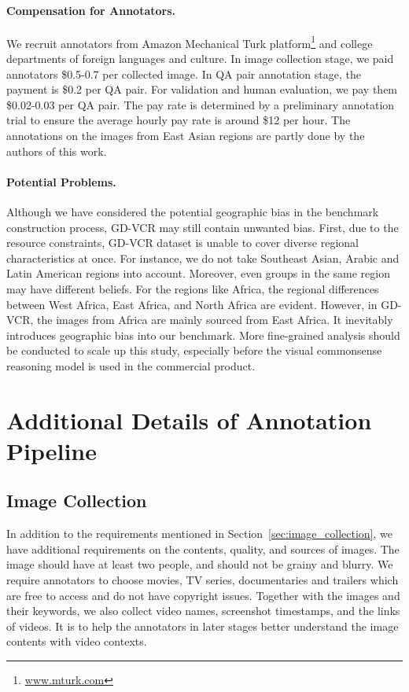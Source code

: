 \documentclass[11pt]{article}
\begin{document}
\paragraph{Compensation for Annotators.}
We recruit annotators from Amazon Mechanical Turk platform\footnote{\url{www.mturk.com}} and college departments of foreign languages and culture. In image collection stage, we paid annotators \$0.5-0.7 per collected image. In QA pair annotation stage, the payment is \$0.2 per QA pair. For validation and human evaluation, we pay them \$0.02-0.03 per QA pair. The pay rate is determined by a preliminary annotation trial to ensure the average hourly pay rate is around \$12 per hour. 
The annotations on the images from East Asian regions are partly done by the authors of this work.

\paragraph{Potential Problems.}
Although we have considered the potential geographic bias in the benchmark construction process, GD-VCR may still contain unwanted bias. First, due to the resource constraints, GD-VCR dataset is unable to cover diverse regional characteristics at once. For instance, we do not take Southeast Asian, Arabic and Latin American regions into account. Moreover, even groups in the same region may have different beliefs. For the regions like Africa, the regional differences between West Africa, East Africa, and North Africa are evident. However, in GD-VCR, the images from Africa are mainly sourced from East Africa. It inevitably introduces geographic bias into our benchmark. More fine-grained analysis should be conducted to scale up this study, especially before the visual commonsense reasoning model is used in the commercial product.




\appendix

\clearpage

\section{Additional Details of Annotation Pipeline}
\label{sec:appendix}
\subsection{Image Collection}
\label{appendix:image_collection_1}
In addition to the requirements mentioned in Section~\ref{sec:image_collection}, we have additional requirements on the contents, quality, and sources of images. The image should have at least two people, and should not be grainy and blurry. We require annotators to choose movies, TV series, documentaries and trailers which are free to access and do not have copyright issues. Together with the images and their keywords, we also collect video names, screenshot timestamps, and the links of videos. It is to help the annotators in later stages better understand the image contents with video contexts.
\end{document}
